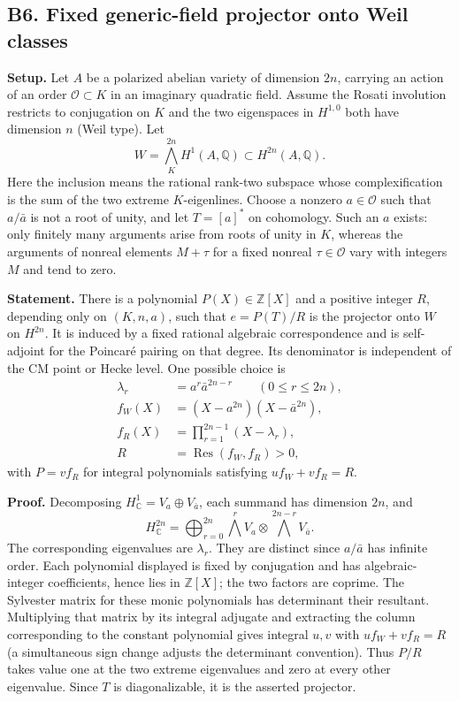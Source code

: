 \subsection{B6. Fixed generic-field projector onto Weil classes}\label{b6.-fixed-generic-field-projector-onto-weil-classes}

\textbf{Setup.} Let \(A\) be a polarized abelian variety of dimension \(2n\), carrying an action of an order \(\mathcal O\subset K\) in an imaginary quadratic field. Assume the Rosati involution restricts to conjugation on \(K\) and the two eigenspaces in \(H^{1,0}\) both have dimension \(n\) (Weil type). Let \[
 W=\bigwedge_K^{2n}H^1(A,\mathbb Q)\subset H^{2n}(A,\mathbb Q).
\] Here the inclusion means the rational rank-two subspace whose complexification is the sum of the two extreme \(K\)-eigenlines. Choose a nonzero \(a\in\mathcal O\) such that \(a/\bar a\) is not a root of unity, and let \(T=[a]^*\) on cohomology. Such an \(a\) exists: only finitely many arguments arise from roots of unity in \(K\), whereas the arguments of nonreal elements \(M+\tau\) for a fixed nonreal \(\tau\in\mathcal O\) vary with integers \(M\) and tend to zero.

\textbf{Statement.} There is a polynomial \(P(X)\in\mathbb Z[X]\) and a positive integer \(R\), depending only on \((K,n,a)\), such that \(e=P(T)/R\) is the projector onto \(W\) on \(H^{2n}\). It is induced by a fixed rational algebraic correspondence and is self-adjoint for the Poincaré pairing on that degree. Its denominator is independent of the CM point or Hecke level. One possible choice is \[
 \begin{aligned}
 \lambda_r&=a^r\bar a^{2n-r}\qquad(0\leq r\leq2n),\\
 f_W(X)&=(X-a^{2n})(X-\bar a^{2n}),\\
 f_R(X)&=\prod_{r=1}^{2n-1}(X-\lambda_r),\\
 R&=\operatorname{Res}(f_W,f_R)>0,
 \end{aligned}
\] with \(P=vf_R\) for integral polynomials satisfying \(u f_W+v f_R=R\).

\textbf{Proof.} Decomposing \(H^1_\mathbb C=V_a\oplus V_{\bar a}\), each summand has dimension \(2n\), and \[
 H^{2n}_\mathbb C=\bigoplus_{r=0}^{2n}\bigwedge^rV_a\otimes\bigwedge^{2n-r}V_{\bar a}.
\] The corresponding eigenvalues are \(\lambda_r\). They are distinct since \(a/\bar a\) has infinite order. Each polynomial displayed is fixed by conjugation and has algebraic-integer coefficients, hence lies in \(\mathbb Z[X]\); the two factors are coprime. The Sylvester matrix for these monic polynomials has determinant their resultant. Multiplying that matrix by its integral adjugate and extracting the column corresponding to the constant polynomial gives integral \(u,v\) with \(u f_W+v f_R=R\) (a simultaneous sign change adjusts the determinant convention). Thus \(P/R\) takes value one at the two extreme eigenvalues and zero at every other eigenvalue. Since \(T\) is diagonalizable, it is the asserted projector.

